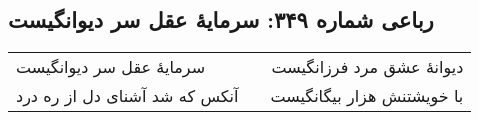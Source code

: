 \begin{center}
\section*{رباعی شماره ۳۴۹: سرمایهٔ عقل سر دیوانگیست}
\label{sec:0349}
\begin{longtable}{l p{0.5cm} r}
سرمایهٔ عقل سر دیوانگیست
&&
دیوانهٔ عشق مرد فرزانگیست
\\
آنکس که شد آشنای دل از ره درد
&&
با خویشتنش هزار بیگانگیست
\\
\end{longtable}
\end{center}
